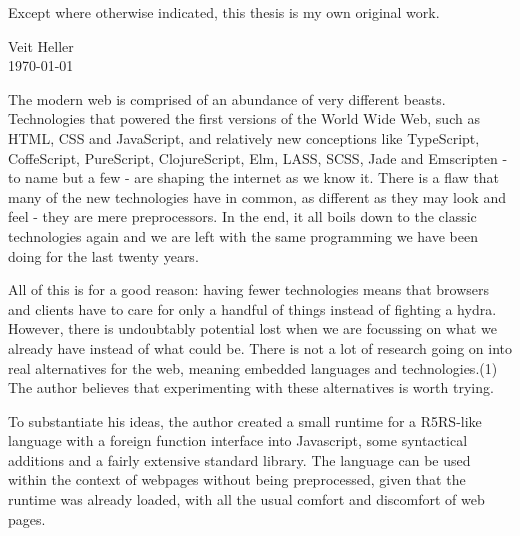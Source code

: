 \documentclass[oneside,11pt,xetex]{scrbook}
\begin{document}
\begin{center}
  Except where otherwise indicated, this thesis is my own original
  work.
\end{center}
\vspace*{4cm}

\begin{flushright}
  \begin{minipage}{4cm}
    Veit Heller\\
    \today
  \end{minipage}
\end{flushright}

\begin{onehalfspace}


The modern web is comprised of an abundance of very different beasts. Technologies that powered the first versions of the World Wide Web, such as HTML, CSS and JavaScript, and relatively new conceptions like TypeScript, CoffeScript, PureScript, ClojureScript, Elm, LASS, SCSS, Jade and Emscripten - to name but a few - are shaping the internet as we know it. There is a flaw that many of the new technologies have in common, as different as they may look and feel - they are mere preprocessors. In the end, it all boils down to the classic technologies again and we are left with the same programming we have been doing for the last twenty years.

All of this is for a good reason: having fewer technologies means that browsers and clients have to care for only a handful of things instead of fighting a hydra. However, there is undoubtably potential lost when we are focussing on what we already have instead of what could be. There is not a lot of research going on into real alternatives for the web, meaning embedded languages and technologies.(1) The author believes that experimenting with these alternatives is worth trying.

To substantiate his ideas, the author created a small runtime for a R5RS-like language with a foreign function interface into Javascript, some syntactical additions and a fairly extensive standard library. The language can be used within the context of webpages without being preprocessed, given that the runtime was already loaded, with all the usual comfort and discomfort of web pages.

\tableofcontents

\printglossary[type=\acronymtype,title=Abbreviations]


\end{onehalfspace}
\end{document}
